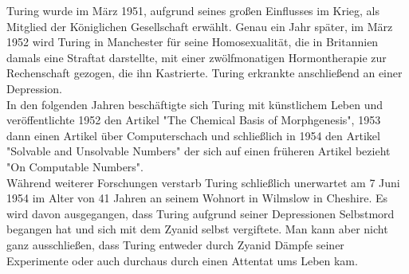 Turing wurde im März 1951, aufgrund seines großen Einflusses im Krieg, als Mitglied der Königlichen Gesellschaft erwählt.
Genau ein Jahr später, im März 1952 wird Turing in Manchester für seine Homosexualität, die in Britannien damals eine Straftat darstellte, mit einer zwölfmonatigen Hormontherapie zur Rechenschaft gezogen, die ihn Kastrierte. Turing erkrankte anschließend an einer Depression.\\
In den folgenden Jahren beschäftigte sich Turing mit künstlichem Leben und veröffentlichte 1952 den Artikel "The Chemical Basis of Morphgenesis", 1953 dann einen Artikel über Computerschach und schließlich in 1954 den Artikel "Solvable and Unsolvable Numbers" der sich auf einen früheren Artikel bezieht "On Computable Numbers".\\
Während weiterer Forschungen verstarb Turing schließlich unerwartet am 7 Juni 1954 im Alter von 41 Jahren an seinem Wohnort in Wilmslow in Cheshire. Es wird davon ausgegangen, dass Turing aufgrund seiner Depressionen Selbstmord begangen hat und sich mit dem Zyanid selbst vergiftete. Man kann aber nicht ganz ausschließen, dass Turing entweder durch Zyanid Dämpfe seiner Experimente oder auch durchaus durch einen Attentat ums Leben kam. 

